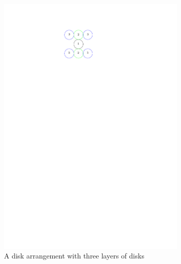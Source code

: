 \begin{figure}[H]
\begin{center}
\begin{subfigure}[b]{0.24\textwidth}
	  \includegraphics[width=\textwidth]{graphics/degree3arrangement.pdf}
	  \caption{A disk arrangement with three layers of disks}
	  \label{fig:circlePacking1-2}
  \end{subfigure}
  \begin{subfigure}[b]{0.24\textwidth}

\end{subfigure}
\end{center}
\end{figure}
